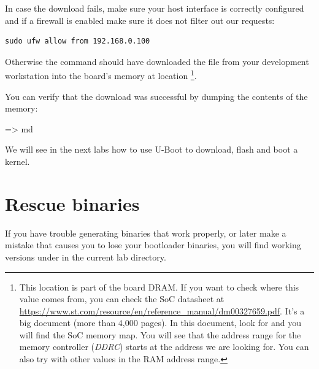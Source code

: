 In case the download fails, make sure your host interface is correctly
configured and if a firewall is enabled make sure it does not filter out our
requests:
\begin{verbatim}
sudo ufw allow from 192.168.0.100
\end{verbatim}

Otherwise the  command should have downloaded the
 file from your development workstation into
the board's memory at location {\tt \zimageboardaddr}\footnote{
This location is part of the board DRAM. If you want
to check where this value comes from, you can check the SoC
datasheet at
\url{https://www.st.com/resource/en/reference_manual/dm00327659.pdf}.
It's a big document (more than 4,000 pages). In this document, look
for  and you will find the SoC memory map.
You will see that the address range for the memory controller
({\em DDRC})
starts at the address we are looking for.
You can also try with other values in the RAM address range.}.

You can verify that the download was successful by dumping the
contents of the memory:

\begin{ubootinput}
=> md %
\end{ubootinput}

We will see in the next labs how to use U-Boot to download, flash and
boot a kernel.



\section{Rescue binaries}

If you have trouble generating binaries that work properly, or later
make a mistake that causes you to lose your bootloader binaries, you
will find working versions under  in the current lab
directory.
